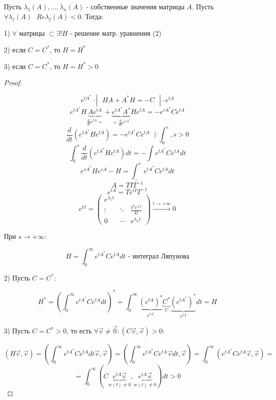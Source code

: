 \documentclass[12pt, a4paper]{report}
\begin{document}
\begin{theorem}
    Пусть \( \lambda_1(A ) , ..., \lambda_n (A )  \) - собственные значения матрицы \( A \). Пусть \( \forall  \lambda_j (A ) \text{ } Re \lambda_j (A ) < 0  \). Тогда: 

    1) \( \forall   \) матрицы \(  \subset \exists ! H  \) - решение матр. уравнения (2)

    2) если \( C = C^*  \), то \( H = H^* \) 

    3) если \( C = C^*  \), то \( H =H^* > 0 \) 
\end{theorem}

\begin{proof} \(  \) 

    \[ e^{ t A ^* }  \cdot   | \text{ }  H A + A ^* H = -C \text{ }  | \cdot e^{tA }   \] 
    \[ e^{t A ^* }  H \underbrace{A e^{tA }}_{\frac{d}{dt }  e^{tA }= }  + \underbrace{e^{t A ^* }  A ^* }_{=\frac{d}{dt } e^{rA ^*}  }H e^{t A }  = - e^{r A ^* }   C e^{t A }  \] 
    \[ \frac{d}{dt } (e^{ t A^* } H e^{tA }   ) = -e^{t A^* } C e^{ tA }  \text{ } |\cdot \int_{0 }^{s} , s>0    \] 
    \[ \int_{0}^{s }  \frac{d}{dt } (e^{ t A^* } H e^{tA }   ) dt = - \int e^{t A^* } C e^{ tA } dt    \] 
    \[ e^{s A ^* }  H e^{ s A }  - H = \int_{- }^{s }  e^{t A ^* }  C e^{t A }  dt  \] 
    \[ A = T I T^{-1 }  \] 
    \[ e^{tA }  = T e^{ t I }  T^{-1 }  \] 
    \[ e^{t I }  = \begin{pmatrix}
    e^{\lambda_1 t }  &  & \\
    \vdots & \ddots & \frac{ t^ k e^{ \lambda_i t } }{ k!}  \\[10pt]
    0 & \cdots   & e^{ \lambda_n t } 
    \end{pmatrix}  \xrightarrow{t \to  + \infty  } 0   \] 

    При \( s \to  + \infty  \): 

    \[ H = \int_{0}^{\infty}  e^{ t A ^* }  C e^{tA }  d t \text{ - интеграл Ляпунова} \tag{3} \]
    
    2) Пусть \( C = C^* :  \) 

    \[ H^* = \left( \int_{0}^{\infty} e^{ t A ^* }  C e^{t A }  dt  \right) ^* = \int_{0 }^{\infty}\underbrace{     (e^{t A } )^*}_{e^{t A ^*} }\underbrace{ C ^* }_{C}\underbrace{ (e^{t A ^* } )^*}_{e^{tA } } dt = H\] 

    3) Пусть \( C = C^* > 0  \), то есть \(  \forall  \vec{v }  \neq  \vec{ 0}  : (C \vec{v } , \vec{v }         ) >0  \): 

    \[ (H \vec{ v }  ,\vec{ v }  ) = \left( \int_{0}^{\infty} e^{t A ^* }  C e^{tA }  dt \vec{v }  ,\vec{v }   \right) = \left( \int_{0}^{\infty} e^{tA^* }  C e^{tA } \vec{ v }  dt , \vec{ v }   \right) = \int_{0}^{\infty} (e^{tA ^* }  C e^{tA }  \vec{v } ,\vec{ v } ) = \] 
    \[ = \int_{0}^{\infty} ( C \underbrace{e^{tA }  \vec{v }}_{ w(t ) \neq  0 }   ,\underbrace{e^{tA }  \vec{ v }}_{w (t ) \neq  0}   ) dt > 0  \] 

\end{proof}
\end{document}
